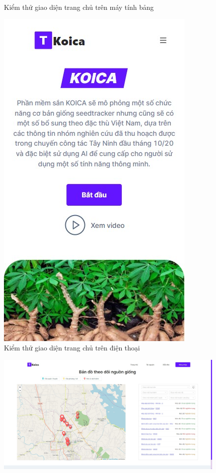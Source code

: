 \documentclass[./../main.tex]{subfiles}
\begin{document}
\begin{itemize}
\begin{figure}[H]
        \caption{Kiểm thử giao diện trang chủ trên máy tính bảng}
        \label{test:hp2}
    \end{figure}
    \begin{figure}[H]
    \centering
        \includegraphics[height=0.4\textheight,keepaspectratio]{./img/test_hp3.jpeg}
        \caption{Kiểm thử giao diện trang chủ trên điện thoại}
        \label{test:hp3}
    \end{figure}
    \begin{figure}[H]
    \centering
        \includegraphics[height=0.34\textheight,keepaspectratio]{./img/test_map1.jpeg}

\end{figure}
\end{itemize}
\end{document}
